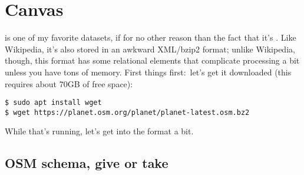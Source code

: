 \section{Canvas}
 is one of my favorite datasets, if for
no other reason than the fact that it's
. Like
Wikipedia, it's also stored in an awkward XML/bzip2 format; unlike Wikipedia,
though, this format has some relational elements that complicate processing a
bit unless you have tons of memory. First things first:~let's get it downloaded
(this requires about 70GB of free space):

\begin{verbatim}
$ sudo apt install wget
$ wget https://planet.osm.org/planet/planet-latest.osm.bz2 \end{verbatim}

While that's running, let's get into the format a bit.

\subsection{OSM schema, give or take}

